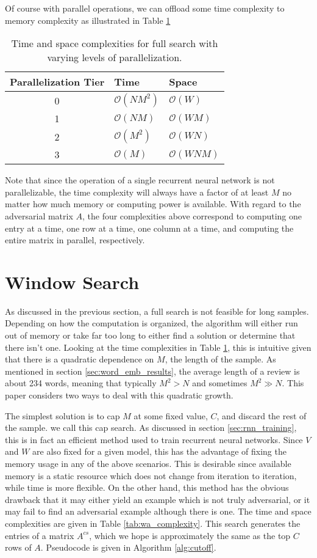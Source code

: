 Of course with parallel operations, we can offload some time complexity to memory complexity as illustrated in Table \ref{tab:fs_complexity}
\begin{table}
\centering
\begin{tabular}{ |c|l|l| } 
 \hline
 Parallelization Tier & Time & Space \\ \hline
 0&$\mathcal{O}(NM^2)$ & $\mathcal{O}(W)$ \\ %
 1&$\mathcal{O}(NM)$ & $\mathcal{O}(WM)$ \\ %
 2&$\mathcal{O}(M^2)$ & $\mathcal{O}(WN)$ \\ %
 3&$\mathcal{O}(M)$ & $\mathcal{O}(WNM)$ \\ \hline
\end{tabular}
\caption{Time and space complexities for full search with varying levels of parallelization.}
\label{tab:fs_complexity}
\end{table}
Note that since the operation of a single recurrent neural network is not parallelizable, the time complexity will always have a factor of at least $M$ no matter how much memory or computing power is available.  With regard to the adversarial matrix $A$, the four complexities above correspond to computing one entry at a time, one row at a time, one column at a time, and computing the entire matrix in parallel, respectively.  

\section{Window Search}
As discussed in the previous section, a full search is not feasible for long samples.  Depending on how the computation is organized, the algorithm will either run out of memory or take far too long to either find a solution or determine that there isn't one.  Looking at the time complexities in Table \ref{tab:fs_complexity}, this is intuitive given that there is a quadratic dependence on $M$, the length of the sample.  As mentioned in section \ref{sec:word_emb_results}, the average length of a review is about 234 words, meaning that typically $M^2 > N$ and sometimes $M^2 \gg N$.  This paper considers two ways to deal with this quadratic growth.

The simplest solution is to cap $M$ at some fixed value, $C$, and discard the rest of the sample.  we call this cap search.  As discussed in section \ref{sec:rnn_training}, this is in fact an efficient method used to train recurrent neural networks.  Since $V$ and $W$ are also fixed for a given model, this has the advantage of fixing the memory usage in any of the above scenarios.  This is desirable since available memory is a static resource which does not change from iteration to iteration, while time is more flexible.  On the other hand, this method has the obvious drawback that it may either yield an example which is not truly adversarial, or it may fail to find an adversarial example although there is one.  The time and space complexities are given in Table \ref{tab:wa_complexity}.  This search generates the entries of a matrix $A^{cs}$, which we hope is approximately the same as the top $C$ rows of $A$.  Pseudocode is given in Algorithm \ref{alg:cutoff}.

